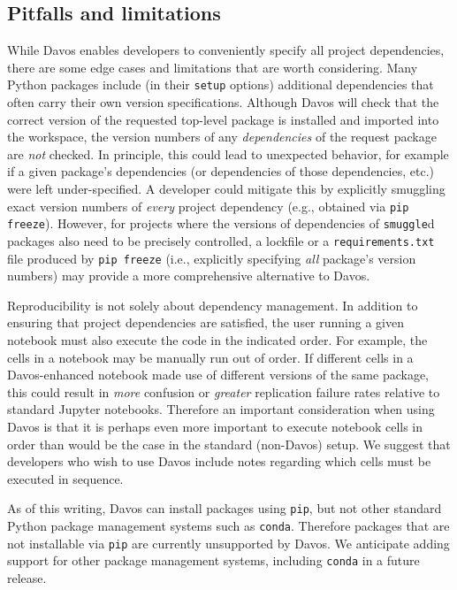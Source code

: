 \documentclass[preprint,12pt,a4paper]{elsarticle}
\begin{document}
\subsection{Pitfalls and limitations}

While Davos enables developers to conveniently specify all project
dependencies, there are some edge cases and limitations that are worth
considering. Many Python packages include (in their \texttt{setup} options)
additional dependencies that often carry their own version specifications.
Although Davos will check that the correct version of the requested
top-level package is installed and imported into the workspace, the version
numbers of any \textit{dependencies} of the request package are \textit{not}
checked. In principle, this could lead to unexpected behavior, for example if a
given package's dependencies (or dependencies of those dependencies, etc.) were
left under-specified. A developer could mitigate this by explicitly smuggling
exact version numbers of \textit{every} project dependency (e.g., obtained via
\texttt{pip freeze}). However, for projects where the versions of dependencies
of \texttt{smuggle}d packages also need to be precisely controlled, a lockfile
or a \texttt{requirements.txt} file produced by \texttt{pip freeze} (i.e.,
explicitly specifying \textit{all} package's version numbers) may provide a
more comprehensive alternative to Davos.

Reproducibility is not solely about dependency management. In addition to
ensuring that project dependencies are satisfied, the user running a given
notebook must also execute the code in the indicated order. For example, the
cells in a notebook may be manually run out of order. If different cells in a
Davos-enhanced notebook made use of different versions of the same
package, this could result in \textit{more} confusion or \textit{greater}
replication failure rates relative to standard Jupyter notebooks. Therefore an
important consideration when using Davos is that it is perhaps even more
important to execute notebook cells in order than would be the case in the
standard (non-Davos) setup.  We suggest that developers who wish to use
Davos include notes regarding which cells must be executed in sequence.

As of this writing, Davos can install packages using \texttt{pip}, but
not other standard Python package management systems such as \texttt{conda}.
Therefore packages that are not installable via \texttt{pip} are currently
unsupported by Davos.  We anticipate adding support for other
package management systems, including \texttt{conda} in a future release.
\end{document}
